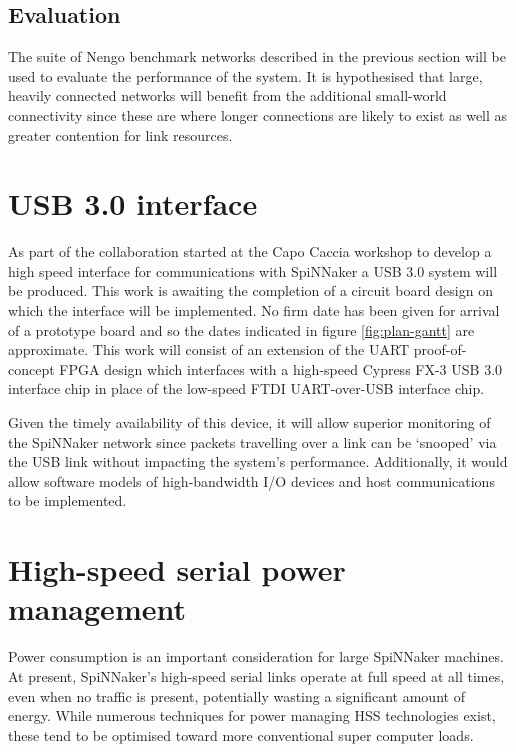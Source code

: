 		\subsection{Evaluation}
			
			The suite of Nengo benchmark networks described in the previous section
			will be used to evaluate the performance of the system. It is hypothesised
			that large, heavily connected networks will benefit from the additional
			small-world connectivity since these are where longer connections are
			likely to exist as well as greater contention for link resources.
	
	
	\section{USB 3.0 interface}
		
		As part of the collaboration started at the Capo Caccia workshop to develop
		a high speed interface for communications with SpiNNaker a USB 3.0 system
		will be produced. This work is awaiting the completion of a circuit board
		design on which the interface will be implemented. No firm date has been
		given for arrival of a prototype board and so the dates indicated in figure
		\ref{fig:plan-gantt} are approximate. This work will consist of an extension
		of the UART proof-of-concept FPGA design which interfaces with a high-speed
		Cypress FX-3 USB 3.0 interface chip in place of the low-speed FTDI
		UART-over-USB interface chip.
		
		Given the timely availability of this device, it will allow superior
		monitoring of the SpiNNaker network since packets travelling over a link can
		be `snooped' via the USB link without impacting the system's performance.
		Additionally, it would allow software models of high-bandwidth I/O devices
		and host communications to be implemented.
	
	
	\section{High-speed serial power management}
		
		
		Power consumption is an important consideration for large SpiNNaker
		machines. At present, SpiNNaker's high-speed serial links operate at full
		speed at all times, even when no traffic is present, potentially wasting a
		significant amount of energy. While numerous techniques for power managing
		HSS technologies exist, these tend to be optimised toward more conventional
		super computer loads.
		
